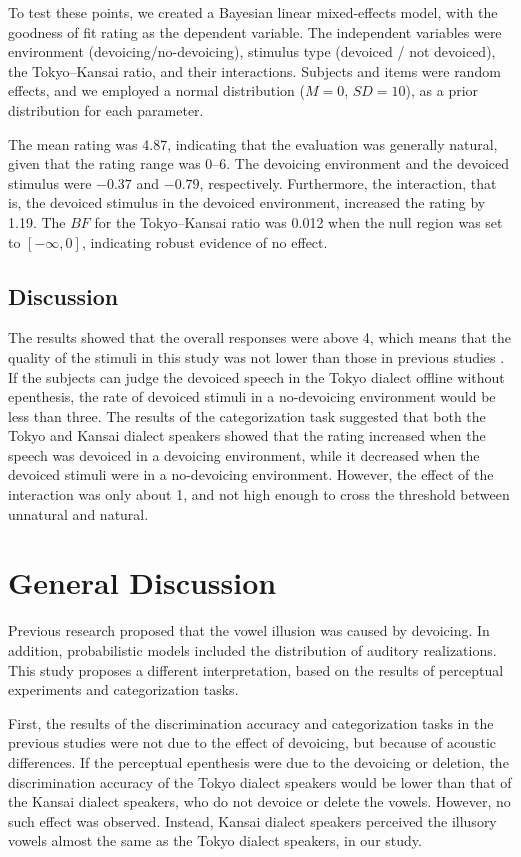 \documentclass[a4paper,11pt,twocolumn]{article}
\begin{document}
To test these points, we created a Bayesian linear mixed-effects model, with the goodness of fit rating as the dependent variable. The independent variables were environment (devoicing/no-devoicing), stimulus type (devoiced / not devoiced), the Tokyo--Kansai ratio, and their interactions. Subjects and items were random effects, and we employed a normal distribution ($M=0$, $SD=10$), as a prior distribution for each parameter.

The mean rating was 4.87, indicating that the evaluation was generally natural, given that the rating range was 0--6. The devoicing environment and the devoiced stimulus were $-0.37$ and $-0.79$, respectively. Furthermore, the interaction, that is, the devoiced stimulus in the devoiced environment, increased the rating by 1.19. The $BF$ for the Tokyo--Kansai ratio was 0.012 when the null region was set to $[-\infty, 0]$, indicating robust evidence of no effect.

\subsection{Discussion}

The results showed that the overall responses were above 4, which means that the quality of the stimuli in this study was not lower than those in previous studies \cite{kilpatrick2018japanese}. If the subjects can judge the devoiced speech in the Tokyo dialect offline without epenthesis, the rate of devoiced stimuli in a no-devoicing environment would be less than three. The results of the categorization task suggested that both the Tokyo and Kansai dialect speakers showed that the rating increased when the speech was devoiced in a devoicing environment, while it decreased when the devoiced stimuli were in a no-devoicing environment. However, the effect of the interaction was only about 1, and not high enough to cross the threshold between unnatural and natural.

\section{General Discussion}

Previous research proposed that the vowel illusion was caused by devoicing. In addition, probabilistic models included the distribution of auditory realizations. This study proposes a different interpretation, based on the results of perceptual experiments and categorization tasks.

First, the results of the discrimination accuracy and categorization tasks in the previous studies were not due to the effect of devoicing, but because of acoustic differences. If the perceptual epenthesis were due to the devoicing or deletion, the discrimination accuracy of the Tokyo dialect speakers would be lower than that of the Kansai dialect speakers, who do not devoice or delete the vowels. However, no such effect was observed. Instead, Kansai dialect speakers perceived the illusory vowels almost the same as the Tokyo dialect speakers, in our study.
\end{document}
